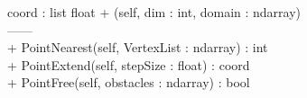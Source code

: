 {
	coord : list float
}
{
+ \dunder (self, dim : int, domain : ndarray) \\ %

------\\
+ PointNearest(self, VertexList : ndarray) : int\\ %
+ PointExtend(self, stepSize : float) : coord \\%

+ PointFree(self, obstacles : ndarray) : bool \\ %
}
